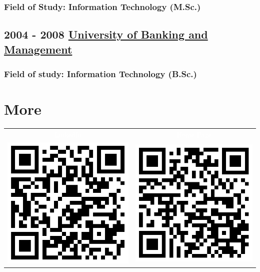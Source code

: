 \documentclass[a4paper]{article}
\begin{document}
\subsubsection*{Field of Study: Information Technology (M.Sc.)\newline}
\subsection*{2004 - 2008 \href{http://www.wszib.edu.pl/index.php?change_lang=en}{University of Banking and Management}}
\subsubsection*{Field of study: Information Technology (B.Sc.)\newline} 

\section*{\LARGE{More\newline}}

\begin{tabular}{c|c}  
	\cellcolor{black}\textcolor{white}{LinkedIn} & \cellcolor{black}\textcolor{white}{Home Page} \\
	\includegraphics[scale=0.4]{qrcode_lnkdn.png} &  \includegraphics[scale=0.4]{qrcode_hme.png} 
\end{tabular}
\end{document}
